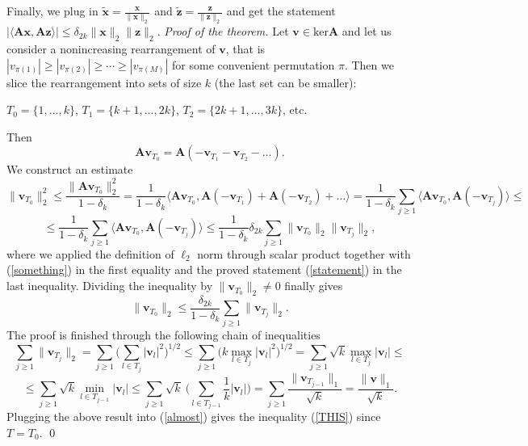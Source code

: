 \documentclass[11pt,oneside,czech,american]{book} %
\theoremstyle{definition} %
\theoremstyle{definition}
\begin{document}
Finally, we plug in $\tilde{\bm{x}} = \frac{\bm{x}}{\lVert \bm{x}\rVert_2}$ and $\tilde{\bm{z}} = \frac{\bm{z}}{\lVert \bm{z}\rVert_2}$ and get the statement $|\langle\bm{Ax},\bm{Az}\rangle| \leq \delta_{2k} \lVert \bm{x} \rVert_2 \lVert \bm{z} \rVert_2$.
\newline
\newline
\emph{Proof of the theorem.}
Let $\bm{v} \in \text{ker} \bm{A}$ and let us consider a nonincreasing rearrangement of $\bm{v}$, that is $|v_{\pi(1)}|\geq |v_{\pi(2)}|\geq \cdots \geq|v_{\pi(M)}|$ for some convenient permutation $\pi$. Then we slice the rearrangement into sets of size $k$ (the last set can be smaller):
\begin{center}
	$T_0 = \{1, \dots, k\}$, $T_1 = \{k+1, \dots, 2k\}$, $T_2 = \{2k+1, \dots, 3k\}$, etc.
\end{center}
Then
\begin{equation}
	\bm{A}\bm{v}_{T_0} = \bm{A}(-\bm{v}_{T_1}-\bm{v}_{T_2}- \dots). \label{something}
\end{equation}
We construct an estimate
\begin{equation*}
	\lVert\bm{v}_{T_0}\rVert_2^{2} \leq \frac{\lVert\bm{Av}_{T_0}\rVert_2^{2}}{1-\delta_k} = \frac{1}{{1-\delta_k}}\langle\bm{A}\bm{v}_{T_0},\bm{A}(-\bm{v}_{T_1})+\bm{A}(-\bm{v}_{T_2}) + \dots\rangle = \frac{1}{{1-\delta_k}} \sum_{j\geq 1}\langle\bm{A}\bm{v}_{T_0},\bm{A}(-\bm{v}_{T_j}) \rangle \leq
\end{equation*}
\begin{equation*}
	\leq \frac{1}{{1-\delta_k}} \sum_{j\geq 1}\langle\bm{A}\bm{v}_{T_0},\bm{A}(-\bm{v}_{T_j})\rangle \leq \frac{1}{1-\delta_{k}} \delta_{2k} \sum_{j\geq 1} \lVert \bm{v}_{T_0}\rVert_2 \lVert \bm{v}_{T_j}\rVert_2,
\end{equation*}
where we applied the definition of $\ell_{2}$ norm through scalar product together with (\ref{something})  in the first equality and the proved statement (\ref{statement}) in the last inequality. Dividing the inequality by $\lVert\bm{v}_{T_0}\rVert_2 \neq 0$ finally gives
\begin{equation}
	\lVert\bm{v}_{T_0}\rVert_2 \leq \frac{\delta_{2k}}{1-\delta_{k}} \sum_{j\geq 1} \lVert \bm{v}_{T_j}\rVert_2. \label{almost}
\end{equation}
The proof is finished through the following chain of inequalities
\begin{equation*}
	\sum_{j\geq 1} \lVert\bm{v}_{T_j}\rVert_2 = \sum_{j\geq 1} \Big( \sum_{l \in T_j} |\bm{v}_l|^2 \Big)^{1/2} \leq \sum_{j\geq 1} \Big( k \max_{l \in T_j} |\bm{v}_l|^2 \Big)^{1/2} = \sum_{j\geq 1} \sqrt k \max_{l \in T_j} |\bm{v}_l| \leq 
\end{equation*}
\begin{equation}
	\leq	\sum_{j\geq 1} \sqrt k \min_{l \in T_{j-1}} |\bm{v}_l|
	\leq \sum_{j\geq 1} \sqrt k \ \Big( \sum_{l \in T_{j-1}} \frac{1}{k} |\bm{v}_l| \Big) = \sum_{j\geq 1} \frac{\lVert \bm{v}_{T_{j-1}}\rVert_1}{\sqrt k} = \frac{\lVert \bm{v} \rVert_1}{\sqrt k}.
	\label{chain}
\end{equation}
Plugging the above result into (\ref{almost}) gives the inequality (\ref{THIS}) since $T = T_0$.
\qed
\end{document}
